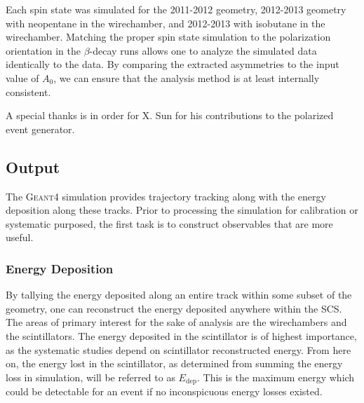 Each spin state was simulated for the 2011-2012 geometry, 2012-2013 geometry with neopentane in the wirechamber,
and 2012-2013 with isobutane in the wirechamber. Matching the proper spin state simulation to the polarization orientation
in the $\beta$-decay runs allows one to analyze the simulated data identically to the data. By comparing the
extracted asymmetries to the input value of $A_0$, we can ensure that the analysis method is at least internally
consistent.

A special thanks is in order for X. Sun for his contributions to the polarized event generator.

\subsection{Output}
The \textsc{Geant4} simulation provides trajectory tracking along with
the energy deposition along these tracks. Prior to processing the simulation
for calibration or systematic purposed, the first
task is to construct observables that are more useful.

\subsubsection{Energy Deposition}
By tallying the energy deposited along an entire track within some subset
of the geometry, one can reconstruct the energy deposited anywhere within
the SCS. The areas of primary interest for the sake of analysis are the
wirechambers and the scintillators. The energy deposited in the scintillator
is of highest importance, as the systematic studies depend on scintillator
reconstructed energy.  From here on,
the energy lost in the scintillator, as determined from summing the energy loss in simulation, will be
referred to as $E_{\mathrm{dep}}$. This is the maximum energy which could be detectable
for an event if no inconspicuous energy losses existed.

